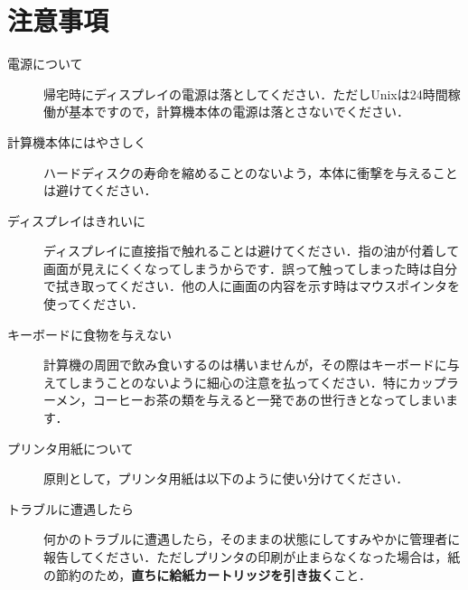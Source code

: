 \documentclass[main]{subfiles}
\begin{document}
\chapter{注意事項}

\begin{description}
    
    \item[電源について] 帰宅時にディスプレイの電源は落としてください．ただしUnixは24時間稼働が基本ですので，計算機本体の電源は落とさないでください．
     
    \item[計算機本体にはやさしく] ハードディスクの寿命を縮めることのないよう，本体に衝撃を与えることは避けてください．

    \item[ディスプレイはきれいに] ディスプレイに直接指で触れることは避けてください．指の油が付着して画面が見えにくくなってしまうからです．誤って触ってしまった時は自分で拭き取ってください．他の人に画面の内容を示す時はマウスポインタを使ってください．

    \item[キーボードに食物を与えない] 計算機の周囲で飲み食いするのは構いませんが，その際はキーボードに与えてしまうことのないように細心の注意を払ってください．特にカップラーメン，コーヒーお茶の類を与えると一発であの世行きとなってしまいます．

    \item[プリンタ用紙について] 原則として，プリンタ用紙は以下のように使い分けてください．

    \vspace{0.8zw}


    \item[トラブルに遭遇したら] 何かのトラブルに遭遇したら，そのままの状態にしてすみやかに管理者に報告してください．ただしプリンタの印刷が止まらなくなった場合は，紙の節約のため，\textrm{\textbf{直ちに給紙カートリッジを引き抜く}}こと．

\end{description}
\end{document}
